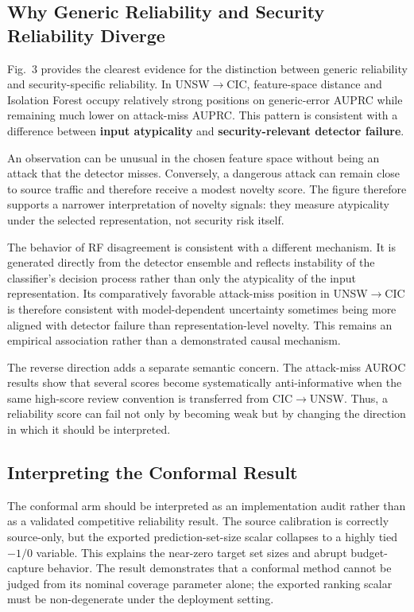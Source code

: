 \documentclass[conference]{IEEEtran}
\begin{document}
\subsection{Why Generic Reliability and Security Reliability Diverge}

Fig.~3 provides the clearest evidence for the distinction between generic reliability and security-specific reliability. In UNSW$\rightarrow$CIC, feature-space distance and Isolation Forest occupy relatively strong positions on generic-error AUPRC while remaining much lower on attack-miss AUPRC. This pattern is consistent with a difference between \textbf{input atypicality} and \textbf{security-relevant detector failure}.

An observation can be unusual in the chosen feature space without being an attack that the detector misses. Conversely, a dangerous attack can remain close to source traffic and therefore receive a modest novelty score. The figure therefore supports a narrower interpretation of novelty signals: they measure atypicality under the selected representation, not security risk itself.

The behavior of RF disagreement is consistent with a different mechanism. It is generated directly from the detector ensemble and reflects instability of the classifier's decision process rather than only the atypicality of the input representation. Its comparatively favorable attack-miss position in UNSW$\rightarrow$CIC is therefore consistent with model-dependent uncertainty sometimes being more aligned with detector failure than representation-level novelty. This remains an empirical association rather than a demonstrated causal mechanism.

The reverse direction adds a separate semantic concern. The attack-miss AUROC results show that several scores become systematically anti-informative when the same high-score review convention is transferred from CIC$\rightarrow$UNSW. Thus, a reliability score can fail not only by becoming weak but by changing the direction in which it should be interpreted.

\subsection{Interpreting the Conformal Result}

The conformal arm should be interpreted as an implementation audit rather than as a validated competitive reliability result. The source calibration is correctly source-only, but the exported prediction-set-size scalar collapses to a highly tied \(-1/0\) variable. This explains the near-zero target set sizes and abrupt budget-capture behavior. The result demonstrates that a conformal method cannot be judged from its nominal coverage parameter alone; the exported ranking scalar must be non-degenerate under the deployment setting.
\end{document}

